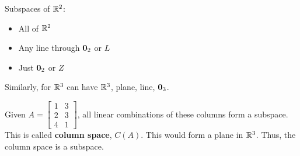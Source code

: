 Subspaces of $\mathbb{R}^2$:
\begin{itemize}
    \item All of $\mathbb{R}^2$
    \item Any line through $\textbf{0}_2$ or $L$
    \item Just $\textbf{0}_2$ or $Z$
\end{itemize}

Similarly, for $\mathbb{R}^3$ can have $\mathbb{R}^3$, plane, line, $\textbf{0}_3$.\newline

Given $A=\left[\begin{array}{ll}
    1 & 3 \\
    2 & 3 \\
    4 & 1\end{array}\right]$, all linear combinations of these columns form a subspace. 
This is called \textbf{column space}, $C(A)$. This would form a plane in $\mathbb{R}^3$. Thus, the column space is a subspace.